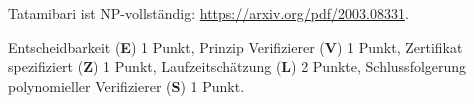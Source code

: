 \begin{diskussion}
Tatamibari ist NP-vollständig: \url{https://arxiv.org/pdf/2003.08331}.
\end{diskussion}


\begin{bewertung}
Entscheidbarkeit ({\bf E}) 1 Punkt,
Prinzip Verifizierer ({\bf V}) 1 Punkt,
Zertifikat spezifiziert ({\bf Z}) 1 Punkt,
Laufzeitschätzung ({\bf L}) 2 Punkte,
Schlussfolgerung polynomieller Verifizierer ({\bf S}) 1 Punkt.
\end{bewertung}

